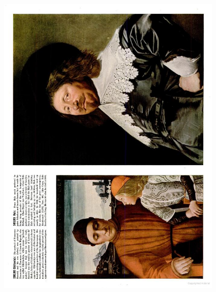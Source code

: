 \begin{figure}

\centering
\includegraphics[height=\textheight, width=\textwidth, keepaspectratio]{./images/goya-sideways.jpg}
\end{figure}


